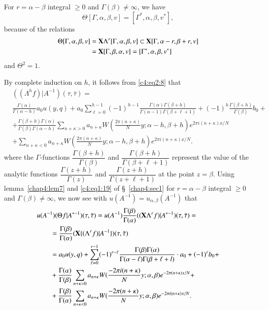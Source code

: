 For $r=\alpha-\beta$ integral $\geq 0$ and $\Gamma(\beta)\neq \infty$,
we have 
\begin{equation*}
\Theta [\Gamma, \alpha, \beta, v] = [\Gamma^{\ast}, \alpha, \beta
  ,v^{\ast}], \tag{13}\label{c4:eq2:13}
\end{equation*}\pageoriginale
because of the relations
\begin{align*}
\Theta[\Gamma, \alpha, \beta, v] & = \mathbf{X} \Lambda^r[\Gamma, \alpha,
  \beta, v] \subset \mathbf{X} [\Gamma, \alpha-r, \beta+r, v]\\
& = \mathbf{X} [\Gamma, \beta, \alpha, v] = [\Gamma^{\ast}, \alpha, \beta, v^{\ast}]
\end{align*}
and $\Theta^2=1$.

By complete induction on $h$, it follows from \eqref{c4:eq2:8} that 
{\fontsize{10}{12}\selectfont
\begin{align*}
& ((\Lambda^hf)|A^{-1})(\tau,\bar{\tau})  = \\
& \frac{\Gamma(\alpha)}{\Gamma(\alpha-h)} a_0 u (y,q) + a_0
\sum^{h-1}_{\ell=0} (-1)^{h-1} \frac{\Gamma(\alpha)
  \Gamma(\beta+h)}{\Gamma(\alpha-1)\Gamma(\beta+\ell+1)} + (-1)^h
\frac{\Gamma(\beta+h)}{\Gamma(\beta)} b_0 + \\
& + \frac{\Gamma(\beta+h)\Gamma(\alpha)}{\Gamma(\beta)\Gamma(\alpha-h)}
\sum_{n+\kappa>0} a_{n+\kappa} W(\frac{2\pi(n+\kappa)}{N} y;
\alpha-h, \beta+h) e^{2\pi i(n+\kappa)x/N}\\
& + \sum_{n+\kappa<0} a_{n+\kappa} W
(\frac{2\pi(n+\kappa)}{N}y;\alpha-h, \beta+h) e^{2\pi i(n+\kappa)x/N}.
\end{align*}}\relax
where the $\Gamma$-functions $\dfrac{\Gamma(\beta+h)}{\Gamma(\beta)}$
and $\dfrac{\Gamma(\beta+h)}{\Gamma(\beta+\ell+1)}$ represent the
value of the analytic functions $\dfrac{\Gamma(z+h)}{\Gamma(z)}$ and
$\dfrac{\Gamma(z+h)}{\Gamma(z+\ell+1)}$ at the point $z=\beta$. Using
lemma~\ref{chap4:lem7} and \eqref{c4:eq1:19} of \S~\ref{chap4:sec1} 
for $r=\alpha-\beta$ integral $\geq 0$ and
$\Gamma(\beta) \neq \infty$, we now see with $u(A^{-1}) = u_{\alpha,
\beta}(A^{-1})$ that 
\begin{align*}
&u(A^{-1}) (\Theta f|A^{\ast-1}) (\tau,\bar{\tau}) = u(A^{-1})
\frac{\Gamma(\beta)}{\Gamma(\alpha)} ((\mathbf{X} \Lambda^r f)|A^{\ast-1})
(\tau,\bar{\tau}) =\\
&\qquad = \frac{\Gamma(\beta)}{\Gamma(\alpha)} (\mathbf{X}
\{(\Lambda^rf)|A^{-1}\})(\tau,\bar{\tau}) \\
&\qquad = a_0 u(y,q) + \sum^{r-1}_{\ell=0} (-1)^{r-\ell}
\frac{\Gamma(\beta)\Gamma(\alpha)}{\Gamma
  (\alpha-\ell)\Gamma(\beta+\ell+l)} \cdot a_0 + (-1)^rb_0 + \\
&\qquad + \frac{\Gamma(\alpha)}{\Gamma(\beta)} \sum_{n+\kappa > 0}
a_{n+\kappa} W (\frac{-2\pi i(n+\kappa)}{N} y; \alpha, \beta)
e^{-2\pi(n+\kappa)x/N} + \\
&\qquad + \frac{\Gamma(\beta)}{\Gamma(\alpha)} \sum_{n+\kappa<0}
a_{n+\kappa} W(\frac{-2\pi(n+\kappa)}{N} y; \alpha, \beta) e^{-2\pi
  i(n+\kappa)x/N}. 
\end{align*}
